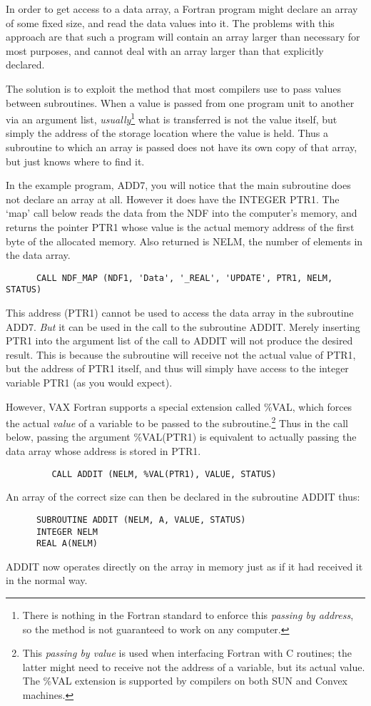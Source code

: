 \documentclass[twoside,11pt]{article}
\renewcommand{\_}{{\tt\char'137}}
\begin{document}
In order to get access to a data array, a Fortran program might 
declare an array of some fixed size, and read the data values 
into it.
The problems with this approach are that such a program will 
contain an array larger than necessary for most purposes, and
cannot deal with an array larger than that explicitly declared.

The solution is to exploit the method that most compilers
use to pass values between subroutines.
When a value is passed from one program unit to another via an argument 
list, 
{\sl usually}\footnote{There is nothing in the Fortran standard to enforce this
{\sl passing by address}, so the method is not guaranteed to work on any
computer.}
what is transferred is not the value itself, but simply the address of the 
storage location where the value is held.
Thus a subroutine to which an array is passed does not have its own copy
of that array, but just knows where to find it.

In the example program, ADD7, you will notice that the main subroutine does not
declare an array at all.
However it does have the INTEGER PTR1.
The `map' call below reads the data from the NDF into the computer's 
memory, and
returns the pointer PTR1 whose value  is the actual memory address of
the first byte of the allocated memory.
Also returned is NELM, the number of elements in the data array.
\begin{verbatim}
      CALL NDF_MAP (NDF1, 'Data', '_REAL', 'UPDATE', PTR1, NELM, STATUS)
\end{verbatim}
This address (PTR1) cannot be used to access  the data array in the subroutine 
ADD7.
{\sl But\/} it can be used in the call to the subroutine ADDIT.
Merely inserting PTR1 into the argument list of the call to 
ADDIT will not produce the desired result.
This is  because the subroutine will receive not 
the actual value of PTR1,
but the address of PTR1 itself, and thus will simply have access to
the integer variable PTR1  (as you would expect).

However, VAX Fortran supports a special extension called \%VAL, which forces 
the actual  {\sl value\/}
of a variable to be passed to the 
subroutine.\footnote{This {\sl passing by value\/} is used when interfacing 
Fortran
with C routines; the latter might need to receive not the address of a
variable, but its actual value.
The \%VAL extension is supported by compilers on both SUN and Convex machines.} 
Thus in  the call below, passing the argument \%VAL(PTR1) is equivalent
to actually passing the data array whose address is stored in PTR1.
\begin{verbatim}
         CALL ADDIT (NELM, %VAL(PTR1), VALUE, STATUS)             
\end{verbatim}
An array of the correct size  can then be declared in the subroutine ADDIT 
thus:
\begin{verbatim}
      SUBROUTINE ADDIT (NELM, A, VALUE, STATUS)                 
      INTEGER NELM
      REAL A(NELM)
\end{verbatim}
ADDIT now operates directly on the array in memory just as if it had 
received it in the normal way.
\end{document}
